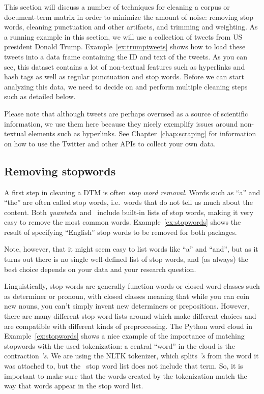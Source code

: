 This section will discuss a number of techniques for cleaning a corpus or document-term matrix in order to minimize the amount of noise: removing stop words, cleaning punctuation and other artifacts, and trimming and weighting.
As a running example in this section, we will use a collection of tweets from US president Donald Trump.
Example~\ref{ex:trumptweets} shows how to load these tweets into a data frame containing the ID and text of the tweets.
As you can see, this dataset contains a lot of non-textual features such as hyperlinks and hash tags as well as regular punctuation and stop words.
Before we can start analyzing this data, we need to decide on and perform multiple cleaning steps such as detailed below.


Please note that although tweets are perhaps overused as a source of scientific information,
we use them here because they nicely exemplify issues around non-textual elements such as hyperlinks.
See Chapter~\ref{chap:scraping} for information on how to use the Twitter and other APIs to collect your own data.

\subsection{Removing stopwords}\label{sec:stopwords}

A first step in cleaning a DTM is often \emph{stop word removal}.
Words such as ``a'' and ``the'' are often called stop words, i.e.\ words that do not tell us much about the content.
Both \emph{quanteda}\ and \sklearn\ include built-in lists of stop words, making it very easy to remove the most common words.
Example~\ref{ex:stopwords} shows the result of specifying ``English'' stop words to be removed for both packages.




Note, however, that it might seem easy to list words like ``a'' and ``and'',
but as it turns out there is no single well-defined list of stop words,
and (as always) the best choice depends on your data and your research question.

Linguistically, stop words are generally function words or closed word classes such as determiner or pronoun,
with closed classes meaning that while you can coin new nouns, you can't simply invent  new determiners or prepositions.
However, there are many different stop word lists around which make different choices and are compatible with
different kinds of preprocessing.
The Python word cloud in Example~\ref{ex:stopwords} shows a nice example of the importance of matching stopwords with the used
tokenization: a central ``word'' in the cloud is the contraction \emph{'s}.
We are using the NLTK tokenizer, which splits \emph{'s} from the word it was attached to, but the \sklearn\ stop word list
does not include that term.
So, it is important to make sure that the words created by the tokenization match the way that words appear in the stop word list.

